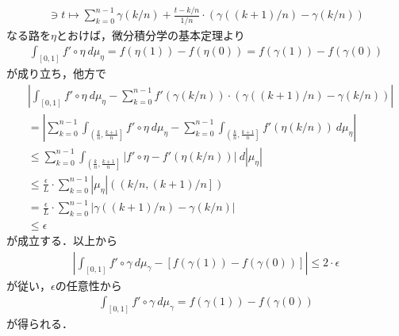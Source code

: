 \begin{sketch}
\begin{align}
			[0,1] \ni t \longmapsto \sum_{k=0}^{n-1} \gamma(k/n) + \frac{t - k/n}{1/n} \cdot \left(\gamma((k+1)/n) - \gamma(k/n)\right)
		\end{align}
		なる路を$\eta$とおけば，微分積分学の基本定理より
		\begin{align}
			\int_{[0,1]} f' \circ \eta\ d\mu_{\eta} = f(\eta(1)) - f(\eta(0))
			= f(\gamma(1)) - f(\gamma(0))
		\end{align}
		が成り立ち，他方で
		\begin{align}
			&\left|\int_{[0,1]} f' \circ \eta\ d\mu_{\eta}
			- \sum_{k=0}^{n-1} f'(\gamma(k/n)) \cdot \left(\gamma((k+1)/n) - \gamma(k/n)\right)\right| \\
			&= \left|\sum_{k=0}^{n-1} \int_{\left(\frac{k}{n},\frac{k+1}{n}\right]} f' \circ \eta\ d\mu_{\eta}
			- \sum_{k=0}^{n-1} \int_{\left(\frac{k}{n},\frac{k+1}{n}\right]} f'(\eta(k/n))\ d\mu_{\eta}\right| \\
			&\leq \sum_{k=0}^{n-1} \int_{\left(\frac{k}{n},\frac{k+1}{n}\right]}
			\left|f' \circ \eta - f'(\eta(k/n))\right|\ d|\mu_{\eta}| \\
			&\leq \frac{\epsilon}{L} \cdot \sum_{k=0}^{n-1} |\mu_{\eta}|\left(\left(k/n,(k+1)/n\right]\right) \\
			&= \frac{\epsilon}{L} \cdot \sum_{k=0}^{n-1} \left|\gamma((k+1)/n) - \gamma(k/n)\right| \\
			&\leq \epsilon
		\end{align}
		が成立する．以上から
		\begin{align}
			\left|\int_{[0,1]} f'\circ\gamma\ d\mu_{\gamma}
			- \left[f(\gamma(1)) - f(\gamma(0))\right]\right|
			\leq 2 \cdot \epsilon
		\end{align}
		が従い，$\epsilon$の任意性から
		\begin{align}
			\int_{[0,1]} f'\circ\gamma\ d\mu_{\gamma} = f(\gamma(1)) - f(\gamma(0))
		\end{align}
		が得られる．
		\QED
	\end{sketch}